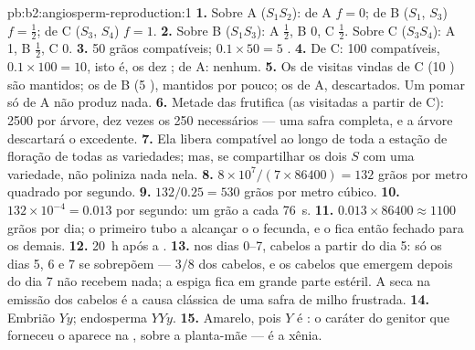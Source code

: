\begin{solution}{pb:b2:angiosperm-reproduction:1}
\textbf{1.} Sobre A ($S_1S_2$):  de A $f = 0$; de B ($S_1$, $S_3$)
$f =
\tfrac12$; de C ($S_3$, $S_4$) $f = 1$.
\textbf{2.} Sobre B ($S_1S_3$): A $\tfrac12$, B 0, C $\tfrac12$. Sobre C
($S_3S_4$): A 1, B $\tfrac12$, C 0.
\textbf{3.} 50 grãos compatíveis; $0.1\times 50 = 5$ .
\textbf{4.} De C: 100 compatíveis, $0.1\times 100 = 10$, isto é, os
dez ; de A: nenhum.
\textbf{5.} Os  de visitas vindas de C (10 ) são
mantidos; os de B (5 ), mantidos por pouco; os de A,
descartados. Um pomar só de A não produz nada.
\textbf{6.} Metade das  frutifica (as visitadas a partir de C):
2500  por árvore, dez vezes os 250 necessários --- uma safra
completa, e a árvore descartará o excedente.
\textbf{7.} Ela libera  compatível ao longo de toda a estação de
floração de todas as variedades; mas, se compartilhar os dois 
$S$ com uma variedade, não poliniza nada nela.
\textbf{8.} $8\times 10^{7}/(7\times 86400) = 132$ grãos por metro
quadrado por segundo.
\textbf{9.} $132/0.25 = 530$ grãos por metro cúbico.
\textbf{10.} $132\times 10^{-4} = 0.013$ por segundo: um grão a cada
\qty{76}{s}.
\textbf{11.} $0.013\times 86400 \approx 1100$ grãos por dia; o primeiro
tubo a alcançar o  o fecunda, e o  fica então fechado para
os demais.
\textbf{12.} \qty{20}{h} após a .
\textbf{13.}  nos dias 0--7, cabelos a partir do dia 5: só os dias
5, 6 e 7 se sobrepõem --- $3/8$ dos cabelos, e os cabelos
que emergem depois do dia 7 não recebem nada; a espiga fica em grande
parte estéril. A seca na emissão dos cabelos é a causa clássica de uma
safra de milho frustrada.
\textbf{14.} Embrião $Yy$; endosperma $YYy$.
\textbf{15.} Amarelo, pois $Y$ é : o caráter do genitor que
forneceu o  aparece na , sobre a planta-mãe --- é a xênia.

\end{solution}
